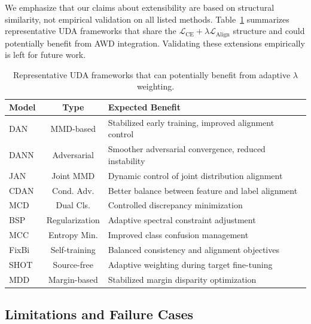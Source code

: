 \documentclass[pdflatex,sn-mathphys-num]{sn-jnl}
\theoremstyle{thmstyleone}
\theoremstyle{thmstyletwo}
\theoremstyle{thmstylethree}
\begin{document}
We emphasize that our claims about extensibility are based on structural similarity, not empirical validation on all listed methods.
Table~\ref{tab:extend_models} summarizes representative UDA frameworks that share the $\mathcal{L}_{\text{CE}} + \lambda \mathcal{L}_{\text{Align}}$ structure and could potentially benefit from AWD integration. Validating these extensions empirically is left for future work.

\begin{table}[t]
    \centering
    \small 
    \caption{Representative UDA frameworks that can potentially benefit from adaptive $\lambda$ weighting.}
    \label{tab:extend_models}
    \begin{tabularx}{\columnwidth}{l c X}
        \toprule
        \textbf{Model} & \textbf{Type} & \textbf{Expected Benefit} \\
        \midrule
        DAN~\cite{long2015dan} & MMD-based & Stabilized early training, improved alignment control \\
        DANN~\cite{ganin2016dann} & Adversarial & Smoother adversarial convergence, reduced instability \\
        JAN~\cite{long2017jan} & Joint MMD & Dynamic control of joint distribution alignment \\
        CDAN~\cite{long2018cdan} & Cond. Adv. & Better balance between feature and label alignment \\
        MCD~\cite{saito2018mcd} & Dual Cls. & Controlled discrepancy minimization \\
        BSP~\cite{chen2019bsp} & Regularization & Adaptive spectral constraint adjustment \\
        MCC~\cite{jin2020mcc} & Entropy Min. & Improved class confusion management \\
        FixBi~\cite{na2021fixbi} & Self-training & Balanced consistency and alignment objectives \\
        SHOT~\cite{liang2020shot} & Source-free & Adaptive weighting during target fine-tuning \\
        MDD~\cite{zhang2019mdd} & Margin-based & Stabilized margin disparity optimization \\
        \bottomrule
    \end{tabularx}
\end{table}

\subsection{Limitations and Failure Cases}
\label{sec:limitations}
\end{document}

